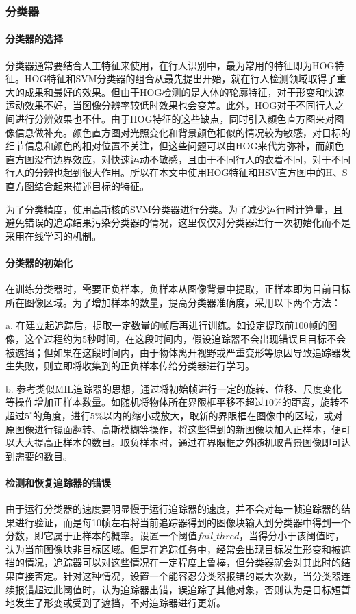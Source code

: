 \subsubsection{分类器}
\paragraph{分类器的选择}
  分类器通常要结合人工特征来使用，在行人识别中，最为常用的特征即为HOG特征。HOG特征和SVM分类器的组合从\citet{dalal2005histograms}最先提出开始，就在行人检测领域取得了重大的成果和最好的效果。但由于HOG检测的是人体的轮廓特征，对于形变和快速运动效果不好，当图像分辨率较低时效果也会变差。此外，HOG对于不同行人之间进行分辨效果也不佳。由于HOG特征的这些缺点，同时引入颜色直方图来对图像信息做补充。颜色直方图对光照变化和背景颜色相似的情况较为敏感，对目标的细节信息和颜色的相对位置不关注，但这些问题可以由HOG来代为弥补，而颜色直方图没有边界效应，对快速运动不敏感，且由于不同行人的衣着不同，对于不同行人的分辨也起到很大作用。所以在本文中使用HOG特征和HSV直方图中的H、S直方图结合起来描述目标的特征。

  为了分类精度，使用高斯核的SVM分类器进行分类。为了减少运行时计算量，且避免错误的追踪结果污染分类器的情况，这里仅仅对分类器进行一次初始化而不是采用在线学习的机制。

\paragraph{分类器的初始化}

  在训练分类器时，需要正负样本，负样本从图像背景中提取，正样本即为目前目标所在图像区域。为了增加样本的数量，提高分类器准确度，采用以下两个方法：
  
  a. 在建立起追踪后，提取一定数量的帧后再进行训练。如设定提取前100帧的图像，这个过程约为5秒时间，在这段时间内，假设追踪器不会出现错误且目标不会被遮挡；但如果在这段时间内，由于物体离开视野或严重变形等原因导致追踪器发生失败，则立即将收集到的正负样本传给分类器进行学习。

  b. 参考类似MIL追踪器的思想，通过将初始帧进行一定的旋转、位移、尺度变化等操作增加正样本数量。如随机将物体所在界限框平移不超过$10\%$的距离，旋转不超过$5^{\circ}$的角度，进行$5\%$以内的缩小或放大，取新的界限框在图像中的区域，或对原图像进行镜面翻转、高斯模糊等操作，将这些得到的新图像块加入正样本，便可以大大提高正样本的数目。取负样本时，通过在界限框之外随机取背景图像即可达到需要的数目。

\paragraph{检测和恢复追踪器的错误}
  由于运行分类器的速度要明显慢于运行追踪器的速度，并不会对每一帧追踪器的结果进行验证，而是每10帧左右将当前追踪器得到的图像块输入到分类器中得到一个分数，即它属于正样本的概率。设置一个阈值$fail\_thred$，当得分小于该阈值时，认为当前图像块非目标区域。但是在追踪任务中，经常会出现目标发生形变和被遮挡的情况，追踪器可以对这些情况在一定程度上鲁棒，但分类器就会对其此时的结果直接否定。针对这种情况，设置一个能容忍分类器报错的最大次数，当分类器连续报错超过此阈值时，认为追踪器出错，误追踪了其他对象，否则认为是目标短暂地发生了形变或受到了遮挡，不对追踪器进行更新。

